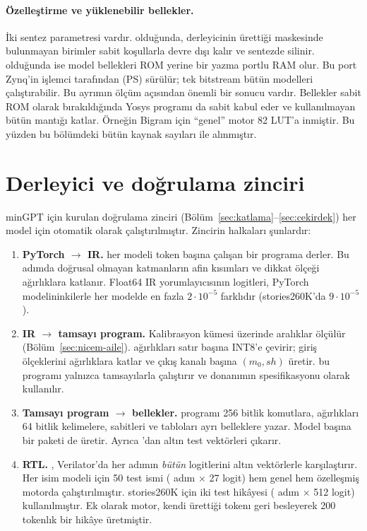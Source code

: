 \paragraph{Özelleştirme ve yüklenebilir bellekler.} İki sentez parametresi vardır.  olduğunda, derleyicinin ürettiği  maskesinde bulunmayan birimler sabit koşullarla devre dışı kalır ve sentezde silinir.  olduğunda ise model bellekleri ROM yerine bir yazma portlu RAM olur. Bu port Zynq'in işlemci tarafından (PS) sürülür; tek bitstream bütün modelleri çalıştırabilir. Bu ayrımın ölçüm açısından önemli bir sonucu vardır. Bellekler sabit ROM olarak bırakıldığında Yosys programı da sabit kabul eder ve kullanılmayan bütün mantığı katlar. Örneğin Bigram için ``genel'' motor 82 LUT'a inmiştir. Bu yüzden bu bölümdeki bütün kaynak sayıları  ile alınmıştır.

\section{Derleyici ve doğrulama zinciri}\label{sec:zincir}

minGPT için kurulan doğrulama zinciri (Bölüm~\ref{sec:katlama}--\ref{sec:cekirdek}) her model için otomatik olarak çalıştırılmıştır. Zincirin halkaları şunlardır:
\begin{enumerate}
  \item \textbf{PyTorch $\to$ IR.}  her modeli token başına çalışan bir programa derler. Bu adımda doğrusal olmayan katmanların afin kısımları ve dikkat ölçeği ağırlıklara katlanır. Float64 IR yorumlayıcısının logitleri, PyTorch modelininkilerle her modelde en fazla $2\cdot10^{-5}$ farklıdır (stories260K'da $9\cdot10^{-5}$).
  \item \textbf{IR $\to$ tamsayı program.} Kalibrasyon kümesi üzerinde aralıklar ölçülür (Bölüm~\ref{sec:nicem-aile}).  ağırlıkları satır başına INT8'e çevirir; giriş ölçeklerini ağırlıklara katlar ve çıkış kanalı başına $(m_0, sh)$ üretir.  bu programı yalnızca tamsayılarla çalıştırır ve donanımın spesifikasyonu olarak kullanılır.
  \item \textbf{Tamsayı program $\to$ bellekler.}  programı 256 bitlik komutlara, ağırlıkları 64 bitlik kelimelere, sabitleri ve tabloları ayrı belleklere yazar. Model başına bir  paketi de üretir. Ayrıca 'dan altın test vektörleri çıkarır.
  \item \textbf{RTL.} , Verilator'da her adımın \emph{bütün} logitlerini altın vektörlerle karşılaştırır. Her isim modeli için 50 test ismi (\zooGptSteps{} adım $\times$ 27 logit) hem genel hem özelleşmiş motorda çalıştırılmıştır. stories260K için iki test hikâyesi (\zooStoriesSteps{} adım $\times$ 512 logit) kullanılmıştır. Ek olarak motor, kendi ürettiği tokenı geri besleyerek 200 tokenlık bir hikâye üretmiştir.
\end{enumerate}

